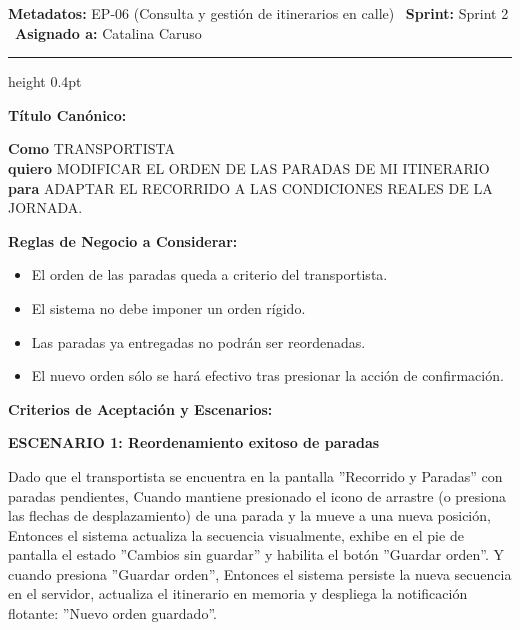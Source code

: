 \documentclass[a4paper,9pt]{article}
\begin{document}
\begin{tcolorbox}[hucard, title={\textbf{HU-24: REORDENAR PARADAS} \hfill \scriptsize \colorbox{tealstatus}{\textbf{\ Accepted\ }} \quad \colorbox{white}{\textcolor{primarydark}{\textbf{\ 3 pts\ }}}}]
\vspace{-1pt}
\noindent\textbf{\footnotesize Metadatos:} EP-06 (Consulta y gestión de itinerarios en calle) \textbar\ \textbf{Sprint:} Sprint 2 \textbar\ \textbf{Asignado a:} Catalina Caruso\par\vspace{2pt}
\hrule height 0.4pt\par\vspace{3pt}
\noindent\textbf{\footnotesize Título Canónico:}\par\vspace{1pt}
{\small \textbf{Como} TRANSPORTISTA \\ \textbf{quiero} MODIFICAR EL ORDEN DE LAS PARADAS DE MI ITINERARIO \\ \textbf{para} ADAPTAR EL RECORRIDO A LAS CONDICIONES REALES DE LA JORNADA.}\par\vspace{3pt}
\noindent\textbf{\footnotesize Reglas de Negocio a Considerar:}\par\vspace{1pt}
{\footnotesize
\begin{itemize}[leftmargin=12pt, nosep, itemsep=1.5pt, topsep=1pt]
\item El orden de las paradas queda a criterio del transportista.
\item El sistema no debe imponer un orden rígido.
\item Las paradas ya entregadas no podrán ser reordenadas.
\item El nuevo orden sólo se hará efectivo tras presionar la acción de confirmación.
\end{itemize}
}\par\vspace{3pt}
\noindent\textbf{\footnotesize Criterios de Aceptación y Escenarios:}\par\vspace{2pt}
{\footnotesize
\noindent\textbf{\textcolor{secondarydark}{ESCENARIO 1:  Reordenamiento exitoso de paradas}}\par\vspace{1pt}
Dado que el transportista se encuentra en la pantalla ''Recorrido y Paradas'' con paradas pendientes, Cuando mantiene presionado el icono de arrastre (o presiona las flechas de desplazamiento) de una parada y la mueve a una nueva posición, Entonces el sistema actualiza la secuencia visualmente, exhibe en el pie de pantalla el estado ''Cambios sin guardar'' y habilita el botón ''Guardar orden''. Y cuando presiona ''Guardar orden'', Entonces el sistema persiste la nueva secuencia en el servidor, actualiza el itinerario en memoria y despliega la notificación flotante: ''Nuevo orden guardado''.\par\vspace{2.5pt}
}
\end{tcolorbox}
\end{document}
